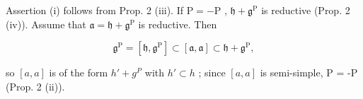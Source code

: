 Assertion (i) follows from Prop. 2 (iii). If \(\mathrm{P} = -\mathrm{P}\) , \(\mathfrak{h} + \mathfrak{g}^{\mathrm{P}}\) is reductive (Prop. 2 (iv)). Assume that \(\mathfrak{a} = \mathfrak{h} + \mathfrak{g}^{\mathrm{P}}\) is reductive. Then

\[
\mathfrak {g} ^ {\mathrm{P}} = \left[ \mathfrak {h}, \mathfrak {g} ^ {\mathrm{P}} \right] \subset \left[ \mathfrak {a}, \mathfrak {a} \right] \subset \mathfrak {h} + \mathfrak {g} ^ {\mathrm{P}},
\]

so \([a, a]\) is of the form \(h' + g^{P}\) with \(h' \subset h\) ; since \([a, a]\) is semi-simple, P = -P (Prop. 2 (ii)).

